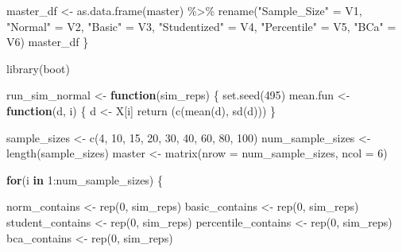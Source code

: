 \documentclass[12pt]{article}
\newenvironment{Shaded}{\begin{snugshade}}{\end{snugshade}}
\newcommand{\AttributeTok}[1]{\textcolor[rgb]{0.77,0.63,0.00}{#1}}
\newcommand{\ControlFlowTok}[1]{\textcolor[rgb]{0.13,0.29,0.53}{\textbf{#1}}}
\newcommand{\DecValTok}[1]{\textcolor[rgb]{0.00,0.00,0.81}{#1}}
\newcommand{\FunctionTok}[1]{\textcolor[rgb]{0.00,0.00,0.00}{#1}}
\newcommand{\NormalTok}[1]{#1}
\newcommand{\OtherTok}[1]{\textcolor[rgb]{0.56,0.35,0.01}{#1}}
\newcommand{\SpecialCharTok}[1]{\textcolor[rgb]{0.00,0.00,0.00}{#1}}
\newcommand{\StringTok}[1]{\textcolor[rgb]{0.31,0.60,0.02}{#1}}
\begin{document}
\begin{Shaded}
\begin{Highlighting}[]
\NormalTok{  master\_df }\OtherTok{\textless{}{-}} \FunctionTok{as.data.frame}\NormalTok{(master) }\SpecialCharTok{\%\textgreater{}\%} 
      \FunctionTok{rename}\NormalTok{(}\StringTok{"Sample\_Size"} \OtherTok{=}\NormalTok{ V1, }\StringTok{"Normal"} \OtherTok{=}\NormalTok{ V2, }\StringTok{"Basic"} \OtherTok{=}\NormalTok{ V3, }\StringTok{"Studentized"} \OtherTok{=}\NormalTok{ V4, }
             \StringTok{"Percentile"} \OtherTok{=}\NormalTok{ V5, }\StringTok{"BCa"} \OtherTok{=}\NormalTok{ V6) }
\NormalTok{  master\_df}
\NormalTok{\}}
\end{Highlighting}
\end{Shaded}

\begin{Shaded}
\begin{Highlighting}[]
\FunctionTok{library}\NormalTok{(boot)}

\NormalTok{run\_sim\_normal }\OtherTok{\textless{}{-}} \ControlFlowTok{function}\NormalTok{(sim\_reps) \{}
  \FunctionTok{set.seed}\NormalTok{(}\DecValTok{495}\NormalTok{)}
\NormalTok{  mean.fun }\OtherTok{\textless{}{-}} \ControlFlowTok{function}\NormalTok{(d, i) \{}
\NormalTok{    d }\OtherTok{\textless{}{-}}\NormalTok{ X[i]}
    \FunctionTok{return}\NormalTok{ (}\FunctionTok{c}\NormalTok{(}\FunctionTok{mean}\NormalTok{(d), }\FunctionTok{sd}\NormalTok{(d)))}
\NormalTok{  \}}
  
\NormalTok{  sample\_sizes }\OtherTok{\textless{}{-}} \FunctionTok{c}\NormalTok{(}\DecValTok{4}\NormalTok{, }\DecValTok{10}\NormalTok{, }\DecValTok{15}\NormalTok{, }\DecValTok{20}\NormalTok{, }\DecValTok{30}\NormalTok{, }\DecValTok{40}\NormalTok{, }\DecValTok{60}\NormalTok{, }\DecValTok{80}\NormalTok{, }\DecValTok{100}\NormalTok{)}
\NormalTok{  num\_sample\_sizes }\OtherTok{\textless{}{-}} \FunctionTok{length}\NormalTok{(sample\_sizes)}
\NormalTok{  master }\OtherTok{\textless{}{-}} \FunctionTok{matrix}\NormalTok{(}\AttributeTok{nrow =}\NormalTok{ num\_sample\_sizes, }\AttributeTok{ncol =} \DecValTok{6}\NormalTok{)}
  
  \ControlFlowTok{for}\NormalTok{(i }\ControlFlowTok{in} \DecValTok{1}\SpecialCharTok{:}\NormalTok{num\_sample\_sizes) \{}
  
\NormalTok{    norm\_contains }\OtherTok{\textless{}{-}} \FunctionTok{rep}\NormalTok{(}\DecValTok{0}\NormalTok{, sim\_reps)}
\NormalTok{    basic\_contains }\OtherTok{\textless{}{-}} \FunctionTok{rep}\NormalTok{(}\DecValTok{0}\NormalTok{, sim\_reps)}
\NormalTok{    student\_contains }\OtherTok{\textless{}{-}} \FunctionTok{rep}\NormalTok{(}\DecValTok{0}\NormalTok{, sim\_reps)}
\NormalTok{    percentile\_contains }\OtherTok{\textless{}{-}} \FunctionTok{rep}\NormalTok{(}\DecValTok{0}\NormalTok{, sim\_reps)}
\NormalTok{    bca\_contains }\OtherTok{\textless{}{-}} \FunctionTok{rep}\NormalTok{(}\DecValTok{0}\NormalTok{, sim\_reps)}
    

\end{Highlighting}
\end{Shaded}
\end{document}
